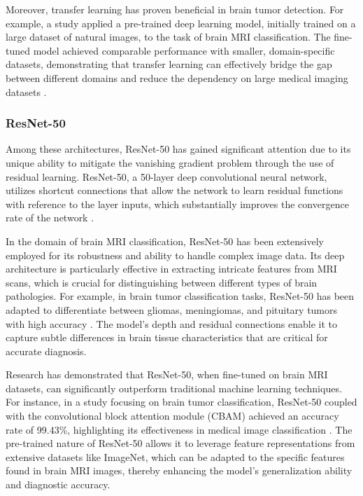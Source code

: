 Moreover, transfer learning has proven beneficial in brain tumor detection. For example, a study applied a pre-trained deep learning model, initially trained on a large dataset of natural images, to the task of brain MRI classification. The fine-tuned model achieved comparable performance with smaller, domain-specific datasets, demonstrating that transfer learning can effectively bridge the gap between different domains and reduce the dependency on large medical imaging datasets \cite{10125766}.

\subsubsection{ResNet-50}
Among these architectures, ResNet-50 has gained significant attention due to its unique ability to mitigate the vanishing gradient problem through the use of residual learning. ResNet-50, a 50-layer deep convolutional neural network, utilizes shortcut connections that allow the network to learn residual functions with reference to the layer inputs, which substantially improves the convergence rate of the network \cite{He_Zhang_Ren_Sun_2015}.

In the domain of brain MRI classification, ResNet-50 has been extensively employed for its robustness and ability to handle complex image data. Its deep architecture is particularly effective in extracting intricate features from MRI scans, which is crucial for distinguishing between different types of brain pathologies. For example, in brain tumor classification tasks, ResNet-50 has been adapted to differentiate between gliomas, meningiomas, and pituitary tumors with high accuracy \cite{Cheng_Huang_Cao_Yang_Yang_Yun_Wang_Feng_2015}. The model's depth and residual connections enable it to capture subtle differences in brain tissue characteristics that are critical for accurate diagnosis.

Research has demonstrated that ResNet-50, when fine-tuned on brain MRI datasets, can significantly outperform traditional machine learning techniques. For instance, in a study focusing on brain tumor classification, ResNet-50 coupled with the convolutional block attention module (CBAM) achieved an accuracy rate of 99.43\%, highlighting its effectiveness in medical image classification \cite{Oladimeji_Ibitoye_2023}. The pre-trained nature of ResNet-50 allows it to leverage feature representations from extensive datasets like ImageNet, which can be adapted to the specific features found in brain MRI images, thereby enhancing the model's generalization ability and diagnostic accuracy.

